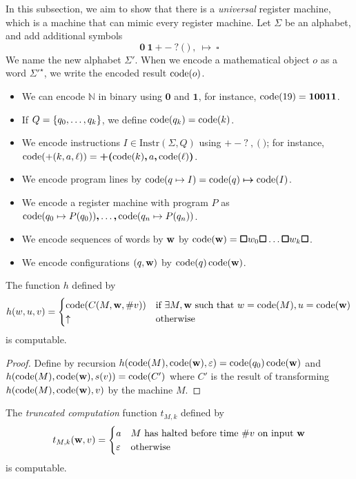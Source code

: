 In this subsection, we aim to show that there is a \emph{universal} register machine, which is a machine that can mimic every register machine.
Let \( \Sigma \) be an alphabet, and add additional symbols
\[ \bm 0\ \bm 1\ \bm +\ \bm -\ \bm ?\ \bm (\ \bm )\ \bm ,\ \bm \mapsto\ \bm \square \]
We name the new alphabet \( \Sigma' \).
When we encode a mathematical object \( o \) as a word \( \Sigma'^\star \), we write the encoded result \( \operatorname{code}(o) \).
\begin{itemize}
	\item We can encode \( \mathbb N \) in binary using \( \bm 0 \) and \( \bm 1 \), for instance, \( \operatorname{code}(19) = \bm 1 \bm 0 \bm 0 \bm 1 \bm 1 \).
	\item If \( Q = \qty{q_0, \dots, q_k} \), we define \( \operatorname{code}(q_k) = \operatorname{code}(k) \).
	\item We encode instructions \( I \in \mathrm{Instr}(\Sigma, Q) \) using \( \bm +\ \bm -\ \bm ?\ \bm ,\ \bm (\ \bm ) \); for instance, \( \operatorname{code}(+(k,a,\ell)) = \bm +\bm(\operatorname{code}(k)\bm , a\bm ,\operatorname{code}(\ell)\bm ) \).
	\item We encode program lines by \( \operatorname{code}(q \mapsto I) = \operatorname{code}(q) \bm \mapsto \operatorname{code}(I) \).
	\item We encode a register machine with program \( P \) as \( \operatorname{code}(q_0 \mapsto P(q_0)) \bm , \ldots \bm , \operatorname{code}(q_n \mapsto P(q_n)) \).
	\item We encode sequences of words by \( \vb w \) by \( \operatorname{code}(\vb w) = \bm\square w_0 \bm\square \ldots \bm\square w_k \bm\square \).
	\item We encode configurations \( (q, \vb w) \) by \( \operatorname{code}(q)\operatorname{code}(\vb w) \).
\end{itemize}
\begin{lemma}
	The function \( h \) defined by
	\[ h(w,u,v) = \begin{cases}
		\operatorname{code}(C(M,\vb w,\# v)) & \text{if } \exists M, \vb w \text{ such that } w = \operatorname{code}(M), u = \operatorname{code}(\vb w) \\
		\uparrow & \text{otherwise}
	\end{cases} \]
	is computable.
\end{lemma}
\begin{proof}
	Define by recursion \( h(\operatorname{code}(M), \operatorname{code}(\vb w), \varepsilon) = \operatorname{code}(q_0)\operatorname{code}(\vb w) \) and \( h(\operatorname{code}(M), \operatorname{code}(\vb w), s(v)) = \operatorname{code}(C') \) where \( C' \) is the result of transforming \( h(\operatorname{code}(M), \operatorname{code}(\vb w), v) \) by the machine \( M \).
\end{proof}
\begin{corollary}
	The \emph{truncated computation} function \( t_{M,k} \) defined by
	\[ t_{M,k}(\vb w, v) = \begin{cases}
		a & M \text{ has halted before time } \#v \text{ on input } \vb w \\
		\varepsilon & \text{otherwise}
	\end{cases} \]
	is computable.
\end{corollary}
